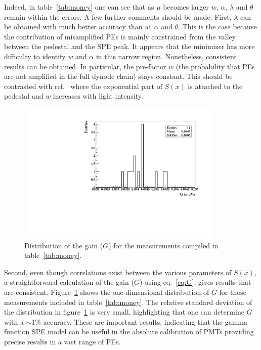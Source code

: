 \documentclass[a4paper,11pt]{article}
\begin{document}
Indeed, in table~\ref{tab:money} one can see that as $\mu$ becomes larger $w$, $\alpha$, $\lambda$ and $\theta$ remain within the errors. 
A few further comments should be made.  
First, $\lambda$ can be obtained with much better accuracy than $w$, $\alpha$ and $\theta$. 
This is the case because the contribution of misamplified PEs is mainly constrained from the valley between the pedestal and the SPE peak. 
It appears that the minimizer has more difficulty to identify $w$ and $\alpha$ in this narrow region. 
Nonetheless, consistent results can be obtained. 
In particular, the pre-factor $w$ (the probability that PEs are not amplified in the full dynode chain) stays constant. 
This should be contrasted with ref.~\cite{Bellamy} where the exponential part of $S(x)$ is attached to the pedestal and $w$ increases with light intensity. 

\begin{figure}[!t]
\centering
\includegraphics[width=10.0cm, height=6.8cm]{figures/G.pdf} 
\caption{Distribution of the gain ($G$) for the measurements compiled in table~\ref{tab:money}. }
\label{fig:g}
\end{figure}

Second, even though correlations exist between the various parameters of $S(x)$, 
a straightforward calculation of the gain ($G$) using eq.~\eqref{eq:G}, gives results that are consistent. 
Figure~\ref{fig:g} shows the one-dimensional distribution of $G$ for those measurements included in table~\ref{tab:money}. 
The relative standard deviation of the distribution in figure~\ref{fig:g} is very small, highlighting that one can determine $G$ with a $\sim$1\% accuracy. 
These are important results, indicating that the gamma function SPE model can be useful in the absolute calibration of PMTs providing precise results in a vast range of PEs.  
\end{document}
